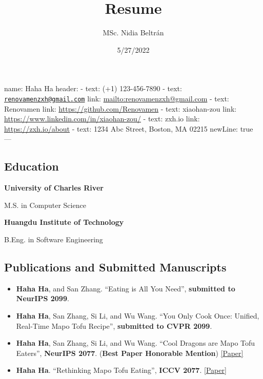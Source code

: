 \documentclass[
]{article}
\title{Resume}
\author{MSc. Nidia Beltrán}
\date{5/27/2022}
\providecommand{\tightlist}{%
  \setlength{\itemsep}{0pt}\setlength{\parskip}{0pt}}
\begin{document}
\maketitle

name: Haha Ha header: - text: {} (+1) 123-456-7890 - text: {}
\href{mailto:renovamenzxh@gmail.com}{\nolinkurl{renovamenzxh@gmail.com}}
link: \url{mailto:renovamenzxh@gmail.com} - text: {} Renovamen link:
\url{https://github.com/Renovamen} - text: {} xiaohan-zou link:
\url{https://www.linkedin.com/in/xiaohan-zou/} - text: {} zxh.io link:
\url{https://zxh.io/about} - text: {} 1234 Abc Street, Boston, MA 02215
newLine: true ---

\hypertarget{education}{%
\subsection{Education}\label{education}}

\begin{description}
\tightlist
\item[Boston, MA]
\textbf{University of Charles River}
\item[09/2021 - 01/2023]
M.S. in Computer Science
\item[Shanghai, China]
\textbf{Huangdu Institute of Technology}
\item[09/2016 - 07/2020]
B.Eng. in Software Engineering
\end{description}

\hypertarget{publications-and-submitted-manuscripts}{%
\subsection{Publications and Submitted
Manuscripts}\label{publications-and-submitted-manuscripts}}

\begin{itemize}
\tightlist
\item
  \textbf{Haha Ha}, and San Zhang. ``Eating is All You Need'',
  \textbf{submitted to NeurIPS 2099}.
\item
  \textbf{Haha Ha}, San Zhang, Si Li, and Wu Wang. ``You Only Cook Once:
  Unified, Real-Time Mapo Tofu Recipe'', \textbf{submitted to CVPR
  2099}.
\item
  \textbf{Haha Ha}, San Zhang, Si Li, and Wu Wang. ``Cool Dragons are
  Mapo Tofu Eaters'', \textbf{NeurIPS 2077}. (\textbf{Best Paper
  Honorable Mention}) \href{https://www.google.com/}{{[}Paper{]}}
\item
  \textbf{Haha Ha}. ``Rethinking Mapo Tofu Eating'', \textbf{ICCV 2077}.
  \href{https://www.google.com/}{{[}Paper{]}}
\end{itemize}
\end{document}

